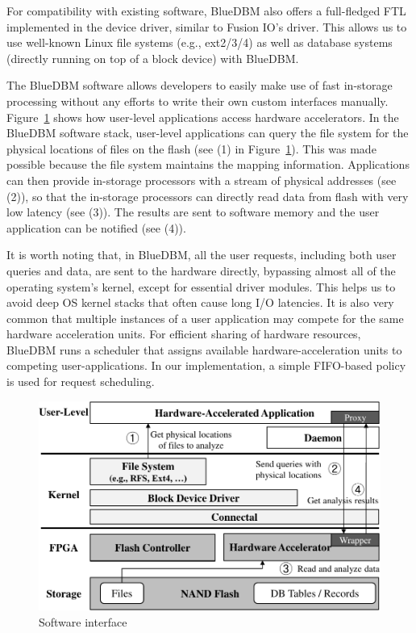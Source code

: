 For compatibility with existing software, BlueDBM also offers a full-fledged
FTL implemented in the device driver, similar to Fusion IO's driver. 
This allows us to use well-known Linux file systems (e.g.,
ext2/3/4) as well as database systems (directly running on top of a block
device) with BlueDBM.

The BlueDBM software allows developers to easily make use of fast in-storage
processing without any efforts to write their own custom interfaces manually.
Figure~\ref{fig:filesystem} shows how user-level applications access hardware
accelerators.  In the BlueDBM software stack, user-level applications can
query the file system for the physical locations of files on the flash (see (1)
in Figure~\ref{fig:filesystem}). This was made possible because the file system
maintains the mapping information.  Applications can then provide in-storage
processors with a stream of physical addresses (see (2)), so that the in-storage processors can directly read
data from flash with very low latency (see (3)).
The results are sent to software memory and the user application can be notified
(see (4)).

It is worth noting that, in BlueDBM, all the user requests, including both
user queries and data, are sent to the hardware directly, bypassing almost all
of the operating system's kernel, except for essential driver modules.  This helps us to avoid deep OS
kernel stacks that often cause long I/O latencies.  It is also very common that
multiple instances of a user application may compete for the same hardware
acceleration units. For efficient sharing of hardware resources, BlueDBM runs
a scheduler that assigns available hardware-acceleration units to competing
user-applications. In our implementation, a simple FIFO-based policy is used for
request scheduling.

\begin{figure}[h]
	\begin{center}
	\includegraphics[width=0.4\paperwidth]{figures/software.pdf}
	\caption{Software interface}
	\label{fig:filesystem}
	\end{center}
\end{figure}
